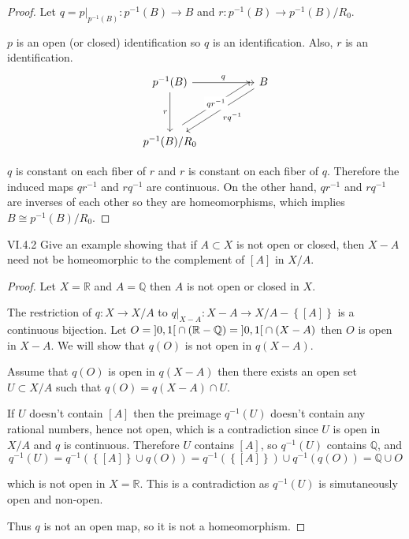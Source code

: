 \begin{proof}
	Let \( q = p\vert_{p^{-1}(B)}: p^{-1}(B) \to B \) and \( r: p^{-1}(B) \to p^{-1}(B)/R_{0} \).

	\( p \) is an open (or closed) identification so \( q \) is an identification. Also, \( r \) is an identification.
	\[
		\begin{tikzcd}
			{p^{-1}(B)} && B \\
			\\
			{p^{-1}(B)/R_{0}}
			\arrow["q", from=1-1, to=1-3]
			\arrow["r"', from=1-1, to=3-1]
			\arrow["{rq^{-1}}", from=1-3, to=3-1]
			\arrow["{qr^{-1}}"{description}, shift left=3, from=3-1, to=1-3]
		\end{tikzcd}
	\]

	\( q \) is constant on each fiber of \( r \) and \( r \) is constant on each fiber of \( q \). Therefore the induced maps \( qr^{-1} \) and \( rq^{-1} \) are continuous. On the other hand, \( qr^{-1} \) and \( rq^{-1} \) are inverses of each other so they are homeomorphisms, which implies \( B \cong p^{-1}(B)/R_{0} \).
\end{proof}

\begin{problem}{VI.4.2}
Give an example showing that if \( A \subset X \) is not open or closed, then \( X - A \) need not be homeomorphic to the complement of \( [A] \) in \( X/A \).
\end{problem}

\begin{proof}
	Let \( X = \mathbb{R} \) and \( A = \mathbb{Q} \) then \( A \) is not open or closed in \( X \).

	The restriction of \( q: X \to X/A \) to \( q\vert_{X - A}: X - A \to X/A - \left\{ [A] \right\} \) is a continuous bijection. Let \( O = \left\rbrack{0, 1}\right\lbrack \cap (\mathbb{R} - \mathbb{Q}) = \left\rbrack{0, 1}\right\lbrack \cap (X - A) \) then \( O \) is open in \( X - A \). We will show that \( q(O) \) is not open in \( q(X - A) \).

	Assume that \( q(O) \) is open in \( q(X - A) \) then there exists an open set \( U \subset X/A \) such that \( q(O) = q(X - A) \cap U \).

	If \( U \) doesn't contain \( [A] \) then the preimage \( q^{-1}(U) \) doesn't contain any rational numbers, hence not open, which is a contradiction since \( U \) is open in \( X/A \) and \( q \) is continuous. Therefore \( U \) contains \( [A] \), so \( q^{-1}(U) \) contains \( \mathbb{Q} \), and
	\[
		q^{-1}(U) = q^{-1}(\left\{ [A] \right\} \cup q(O)) = q^{-1}(\left\{ [A] \right\}) \cup q^{-1}(q(O)) = \mathbb{Q} \cup O
	\]

	which is not open in \( X = \mathbb{R} \). This is a contradiction as \( q^{-1}(U) \) is simutaneously open and non-open.

	Thus \( q \) is not an open map, so it is not a homeomorphism.
\end{proof}


